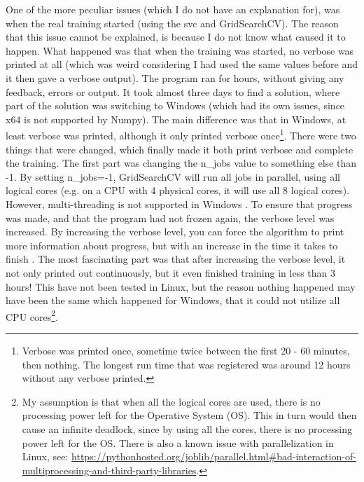 One of the more peculiar issues (which I do not have an explanation for), was when the real training started (using the \gls{svc} and GridSearchCV).
The reason that this issue cannot be explained, is because I do not know what caused it to happen.
What happened was that when the training was started, no verbose was printed at all (which was weird considering I had used the same values before and it then gave a verbose output). 
The program ran for hours, without giving any feedback, errors or output. 
\vspace{0.5em}\newline
It took almost three days to find a solution, where part of the solution was switching to Windows (which had its own issues, since x64 is not supported by Numpy).
The main difference was that in Windows, at least verbose was printed, although it only printed verbose once\footnote{
	Verbose was printed once, sometime twice between the first 20 - 60 minutes, then nothing.
	The longest run time that was registered was around 12 hours without any verbose printed.
}.
There were two things that were changed, which finally made it both print verbose and complete the training.
The first part was changing the n\_jobs value to something else than -1. 
By setting n\_jobs=-1, GridSearchCV will run all jobs in parallel, using all logical cores (e.g. on a CPU with 4 physical cores, it will use all 8 logical cores). 
However, multi-threading is not supported in Windows \cite{GS2015}. 
To ensure that progress was made, and that the program had not frozen again, the verbose level was increased.
By increasing the verbose level, you can force the algorithm to print more information about progress, but with an increase in the time it takes to finish \cite{Manuel2015, user29912432014}. 
The most fascinating part was that after increasing the verbose level, it not only printed out continuously, but it even finished training in less than 3 hours!
This have not been tested in Linux, but the reason nothing happened may have been the same which happened for Windows, that it could not utilize all CPU cores\footnote{
	My assumption is that when all the logical cores are used, there is no processing power left for the Operative System (OS). 
	This in turn would then cause an infinite deadlock, since by using all the cores, there is no processing power left for the OS.
	There is also a known issue with parallelization in Linux, see: 
	\url{https://pythonhosted.org/joblib/parallel.html\#bad-interaction-of-multiprocessing-and-third-party-libraries}.
}.
























